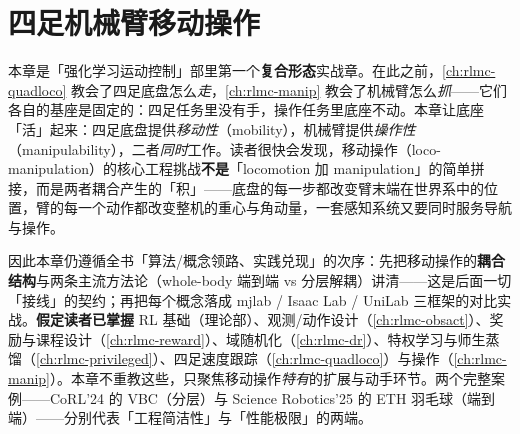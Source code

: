 \chapter{四足机械臂移动操作}\label{ch:rlmc-leggedmanip}


本章是「强化学习运动控制」部里第一个\textbf{复合形态}实战章。在此之前，\cref{ch:rlmc-quadloco} 教会了四足底盘怎么\emph{走}，\cref{ch:rlmc-manip} 教会了机械臂怎么\emph{抓}——它们各自的基座是固定的：四足任务里没有手，操作任务里底座不动。本章让底座「活」起来：四足底盘提供\emph{移动性}（mobility），机械臂提供\emph{操作性}（manipulability），二者\emph{同时}工作。读者很快会发现，移动操作（loco-manipulation）的核心工程挑战\textbf{不是}「locomotion 加 manipulation」的简单拼接，而是两者耦合产生的「积」——底盘的每一步都改变臂末端在世界系中的位置，臂的每一个动作都改变整机的重心与角动量，一套感知系统又要同时服务导航与操作。

因此本章仍遵循全书「算法/概念领路、实践兑现」的次序：先把移动操作的\textbf{耦合结构}与两条主流方法论（whole-body 端到端 vs 分层解耦）讲清——这是后面一切「接线」的契约；再把每个概念落成 mjlab / Isaac Lab / UniLab 三框架的对比实战。\textbf{假定读者已掌握} RL 基础（理论部）、观测/动作设计（\cref{ch:rlmc-obsact}）、奖励与课程设计（\cref{ch:rlmc-reward}）、域随机化（\cref{ch:rlmc-dr}）、特权学习与师生蒸馏（\cref{ch:rlmc-privileged}）、四足速度跟踪（\cref{ch:rlmc-quadloco}）与操作（\cref{ch:rlmc-manip}）。本章不重教这些，只聚焦移动操作\emph{特有}的扩展与动手环节。两个完整案例——CoRL'24 的 VBC（分层）与 Science Robotics'25 的 ETH 羽毛球（端到端）——分别代表「工程简洁性」与「性能极限」的两端。

